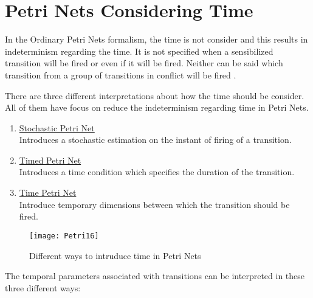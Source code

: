 \section{Petri Nets Considering Time}
	
	In the Ordinary Petri Nets formalism, the time is not consider and this results in indeterminism 
	regarding the time. It is not specified when a sensibilized transition will be fired or even if it
	will be fired. Neither can be said which transition from a group of transitions in conflict will 
	be fired \cite{garciaizquierdo}.
	
	There are three different interpretations about how the time should be consider. All of them have 
	focus on reduce the indeterminism regarding time in Petri Nets.
	\begin{enumerate}
	  	\renewcommand{\theenumi}{\Alph{enumi}}
	  	\item \underline{Stochastic Petri Net}
	  		\\
			Introduces a stochastic estimation on the instant of firing of a transition.
		\item \underline{Timed Petri Net}
			\\
			Introduces a time condition which specifies the duration of the transition.
		\item \underline{Time Petri Net}
			\\
			Introduce temporary dimensions between which the transition should be fired.
	\end{enumerate}
		
	\begin{figure}[h]
		\centering
		\texttt{[image: Petri16]}
		\caption{Different ways to intruduce time in Petri Nets}
		\label{fig:Petri16}
	\end{figure}
	
	The temporal parameters associated with transitions can be interpreted in these three different
	ways\footnotemark:
	
	
